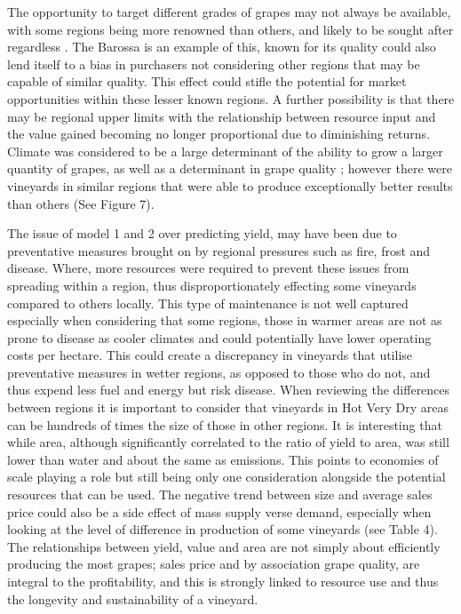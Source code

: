 \documentclass[review,12pt,authoryear]{elsarticle}
\begin{document}
\begin{linenumbers}
The opportunity to target different grades of grapes may not always be available, with some regions being more renowned than others, and likely to be sought after regardless \citep{hallidayAustralianWineEncyclopedia2009}. The Barossa is an example of this, known for its quality could also lend itself to a bias in purchasers not considering other regions that may be capable of similar quality. This effect could stifle the potential for market opportunities within these lesser known regions. A further possibility is that there may be regional upper limits with the relationship between resource input and the value gained becoming no longer proportional due to diminishing returns. Climate was considered to be a large determinant of the ability to grow a larger quantity of grapes, as well as a determinant in grape quality \citep{agostaRegionalClimateVariability2012}; however there were vineyards in similar regions that were able to produce exceptionally better results than others (See Figure 7).

The issue of model 1 and 2 over predicting yield, may have been due to preventative measures brought on by regional pressures such as fire, frost and disease. Where, more resources were required to prevent these issues from spreading within a region, thus disproportionately effecting some vineyards compared to others locally. This type of maintenance is not well captured especially when considering that some regions, those in warmer areas are not as prone to disease as cooler climates and could potentially have lower operating costs per hectare. This could create a discrepancy in vineyards that utilise preventative measures in wetter regions, as opposed to those who do not, and thus expend less fuel and energy but risk disease. When reviewing the differences between regions it is important to consider that vineyards in Hot Very Dry areas can be hundreds of times the size of those in other regions. It is interesting that while area, although significantly correlated to the ratio of yield to area, was still lower than water and about the same as emissions. This points to economies of scale playing a role but still being only one consideration alongside the potential resources that can be used. The negative trend between size and average sales price could also be a side effect of mass supply verse demand, especially when looking at the level of difference in production of some vineyards (see Table 4). The relationships between yield, value and area are not simply about efficiently producing the most grapes; sales price and by association grape quality, are integral to the profitability, and this is strongly linked to resource use and thus the longevity and sustainability of a vineyard. 


\end{linenumbers}
\end{document}
